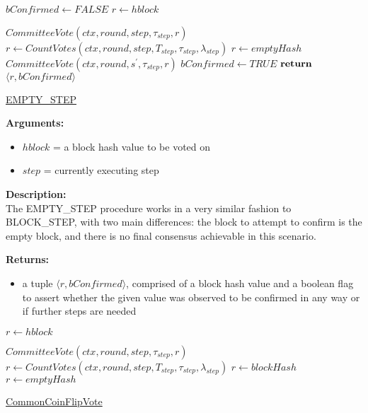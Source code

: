 \documentclass[10pt,a4paper]{article}
\begin{document}
\begin{algorithm}[H]
    \begin{algorithmic}[H]
        \State $bConfirmed \gets FALSE$
        \State $r \gets hblock$

    \State $CommitteeVote(ctx, round, step, \tau_{step}, r)$
    \State $r \gets CountVotes(ctx,round,step,T_{step},\tau_{step},\lambda_{step})$
        \State $r \gets emptyHash$
            \State $CommitteeVote(ctx, round, s^\prime, \tau_{step}, r)$
        \EndFor
        \State $bConfirmed \gets TRUE$
    \EndIf
    $\Return$ $\langle r, bConfirmed \rangle$
    \EndFunction
    \end{algorithmic}
    \caption{\underline{EMPTY\_STEP}}
\end{algorithm}

\noindent \textbf{Arguments:}
\begin{itemize}
    \item $hblock$ = a block hash value to be voted on
    \item $step$ = currently executing step
  \end{itemize}

\noindent \textbf{Description:}\\
The EMPTY\_STEP procedure works in a very similar fashion to BLOCK\_STEP, with two main differences: 
the block to attempt to confirm is the empty block, and there is no final consensus achievable in this scenario.

\noindent \textbf{Returns:}
\begin{itemize}
    \item a tuple $\langle r, bConfirmed \rangle$, comprised of a block hash value and a boolean flag to assert whether the given value was
    observed to be confirmed in any way or if further steps are needed
  \end{itemize}

\begin{algorithm}[H]
    \begin{algorithmic}[H]
        \State $r \gets hblock$
    
        \State $CommitteeVote(ctx, round, step, \tau_{step}, r)$
        \State $r \gets CountVotes(ctx,round,step,T_{step},\tau_{step},\lambda_{step})$
                \State $r \gets blockHash$
            \Else
                \State $r \gets emptyHash$
            \EndIf
        \EndIf
    \EndFunction
    \end{algorithmic}
    \caption{\underline{CommonCoinFlipVote}}
\end{algorithm}
\end{document}
